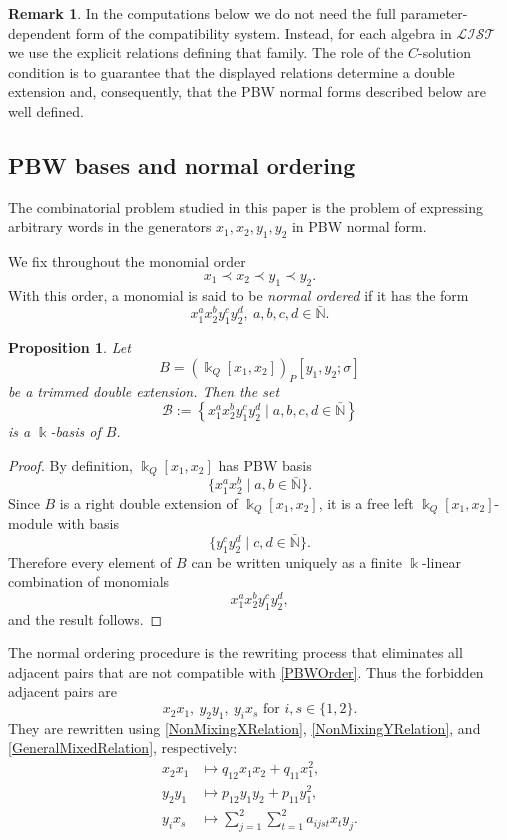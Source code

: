 \documentclass{amsart}
\newtheorem{proposition}[theorem]{Proposition}
\theoremstyle{definition}
\newtheorem{remark}[theorem]{Remark}
\theoremstyle{remark}
\numberwithin{equation}{section}
\begin{document}
\begin{remark}\label{RemarkCSolutions}
In the computations below we do not need the full parameter-dependent form of the compatibility system. Instead, for each algebra in $\mathcal{LIST}$ we use the explicit relations defining that family. The role of the $C$-solution condition is to guarantee that the displayed relations determine a double extension and, consequently, that the PBW normal forms described below are well defined.
\end{remark}

\subsection{PBW bases and normal ordering}\label{SubsectionPBWNormalOrdering}

The combinatorial problem studied in this paper is the problem of expressing arbitrary words in the generators $x_1,x_2,y_1,y_2$ in PBW normal form.

We fix throughout the monomial order
\begin{equation}\label{PBWOrder}
x_1\prec x_2\prec y_1\prec y_2.
\end{equation}
With this order, a monomial is said to be \emph{normal ordered} if it has the form
\[
x_1^ax_2^by_1^cy_2^d,
\ a,b,c,d\in\bar{\mathbb{N}}.
\]

\begin{proposition}\label{PropositionPBWBasis}
Let
\[
B=(\Bbbk_Q[x_1,x_2])_P[y_1,y_2;\sigma]
\]
be a trimmed double extension. Then the set
\[
\mathcal{B}
:=
\left\{
x_1^ax_2^by_1^cy_2^d
\mid
a,b,c,d\in\bar{\mathbb{N}}
\right\}
\]
is a $\Bbbk$-basis of $B$.
\end{proposition}

\begin{proof}
By definition, $\Bbbk_Q[x_1,x_2]$ has PBW basis
\[
\{x_1^ax_2^b\mid a,b\in\bar{\mathbb{N}}\}.
\]
Since $B$ is a right double extension of $\Bbbk_Q[x_1,x_2]$, it is a free left $\Bbbk_Q[x_1,x_2]$-module with basis
\[
\{y_1^cy_2^d\mid c,d\in\bar{\mathbb{N}}\}.
\]
Therefore every element of $B$ can be written uniquely as a finite $\Bbbk$-linear combination of monomials
\[
x_1^ax_2^by_1^cy_2^d,
\]
and the result follows.
\end{proof}

The normal ordering procedure is the rewriting process that eliminates all adjacent pairs that are not compatible with \eqref{PBWOrder}. Thus the forbidden adjacent pairs are
\[
x_2x_1,\ y_2y_1,\ y_ix_s
\text{ for } i,s\in\{1,2\}.
\]
They are rewritten using \eqref{NonMixingXRelation}, \eqref{NonMixingYRelation}, and \eqref{GeneralMixedRelation}, respectively:
\begin{align*}
x_2x_1
&\longmapsto
q_{12}x_1x_2+q_{11}x_1^2,\\
y_2y_1
&\longmapsto
p_{12}y_1y_2+p_{11}y_1^2,\\
y_ix_s
&\longmapsto
\sum_{j=1}^2\sum_{t=1}^2 a_{ijst}x_ty_j.
\end{align*}
\end{document}
